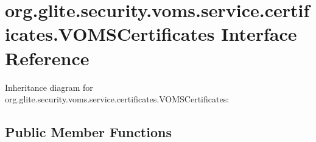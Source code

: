 \hypertarget{interfaceorg_1_1glite_1_1security_1_1voms_1_1service_1_1certificates_1_1VOMSCertificates}{
\section{org.glite.security.voms.service.certificates.VOMSCertificates Interface Reference}
\label{interfaceorg_1_1glite_1_1security_1_1voms_1_1service_1_1certificates_1_1VOMSCertificates}
}


Inheritance diagram for org.glite.security.voms.service.certificates.VOMSCertificates:
\subsection*{Public Member Functions}
